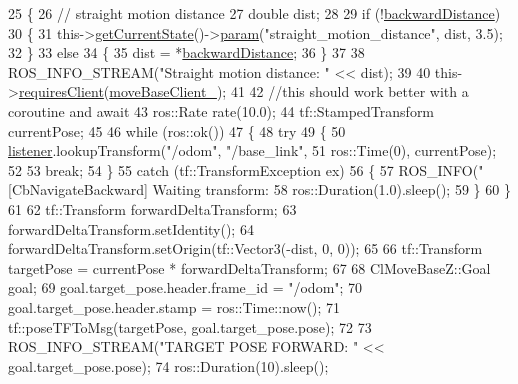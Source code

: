 \begin{DoxyCode}
25 \{
26     \textcolor{comment}{// straight motion distance}
27     \textcolor{keywordtype}{double} dist;
28 
29     \textcolor{keywordflow}{if} (!\hyperlink{classmove__base__z__client_1_1CbNavigateBackwards_a53d06922eff285e4d35f4d7b1b7b7752}{backwardDistance})
30     \{
31         this->\hyperlink{classsmacc_1_1SmaccClientBehavior_abf6773e4dd948f932f11a346dd6e7c2c}{getCurrentState}()->\hyperlink{classsmacc_1_1ISmaccState_a4982f2187ed6da337462721146e8ef70}{param}(\textcolor{stringliteral}{"straight\_motion\_distance"}, dist, 3.5);
32     \}
33     \textcolor{keywordflow}{else}
34     \{
35         dist = *\hyperlink{classmove__base__z__client_1_1CbNavigateBackwards_a53d06922eff285e4d35f4d7b1b7b7752}{backwardDistance};
36     \}
37 
38     ROS\_INFO\_STREAM(\textcolor{stringliteral}{"Straight motion distance: "} << dist);
39 
40     this->\hyperlink{classsmacc_1_1SmaccClientBehavior_a917f001e763a1059af337bf4e164f542}{requiresClient}(\hyperlink{classmove__base__z__client_1_1CbNavigateBackwards_ac94348112821680532527fa006651a6c}{moveBaseClient\_});
41 
42     \textcolor{comment}{//this should work better with a coroutine and await}
43     ros::Rate rate(10.0);
44     tf::StampedTransform currentPose;
45 
46     \textcolor{keywordflow}{while} (ros::ok())
47     \{
48         \textcolor{keywordflow}{try}
49         \{
50             \hyperlink{classmove__base__z__client_1_1CbNavigateBackwards_a13939ba95a738b73e0e26f215791d675}{listener}.lookupTransform(\textcolor{stringliteral}{"/odom"}, \textcolor{stringliteral}{"/base\_link"},
51                                      ros::Time(0), currentPose);
52 
53             \textcolor{keywordflow}{break};
54         \}
55         \textcolor{keywordflow}{catch} (tf::TransformException ex)
56         \{
57             ROS\_INFO(\textcolor{stringliteral}{"[CbNavigateBackward] Waiting transform: %
58             ros::Duration(1.0).sleep();
59         \}
60     \}
61 
62     tf::Transform forwardDeltaTransform;
63     forwardDeltaTransform.setIdentity();
64     forwardDeltaTransform.setOrigin(tf::Vector3(-dist, 0, 0));
65 
66     tf::Transform targetPose = currentPose * forwardDeltaTransform;
67 
68     ClMoveBaseZ::Goal goal;
69     goal.target\_pose.header.frame\_id = \textcolor{stringliteral}{"/odom"};
70     goal.target\_pose.header.stamp = ros::Time::now();
71     tf::poseTFToMsg(targetPose, goal.target\_pose.pose);
72 
73     ROS\_INFO\_STREAM(\textcolor{stringliteral}{"TARGET POSE FORWARD: "} << goal.target\_pose.pose);
74     ros::Duration(10).sleep();
}
\end{DoxyCode}
